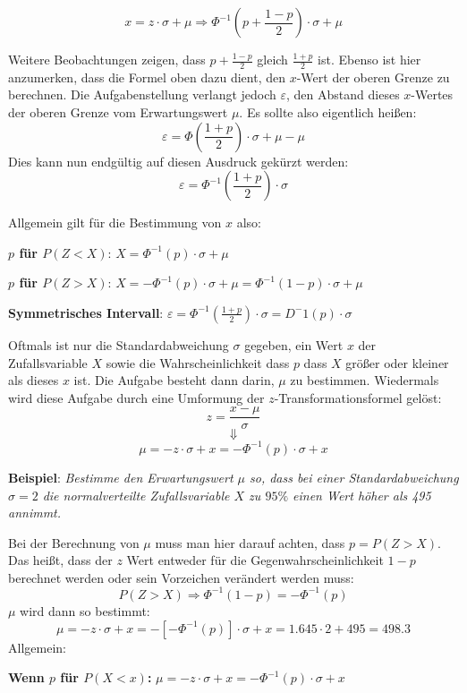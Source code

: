 $$x = z \cdot \sigma + \mu \Rightarrow \Phi^{-1}\left(p + \frac{1 -p}{2}\right) \cdot \sigma + \mu$$ 

\pagebreak

Weitere Beobachtungen zeigen, dass $p + \frac{1 - p}{2}$ gleich $\frac{1 + p}{2}$ ist. Ebenso ist hier anzumerken, dass die Formel oben dazu dient, den $x$-Wert der oberen Grenze zu berechnen. Die Aufgabenstellung verlangt jedoch $\varepsilon$, den Abstand dieses $x$-Wertes der oberen Grenze vom Erwartungswert $\mu$. Es sollte also eigentlich hei\ss{}en: $$\varepsilon = \Phi\left(\frac{1 + p}{2}\right) \cdot \sigma + \mu - \mu$$ Dies kann nun endg\"{u}ltig auf diesen Ausdruck gek\"{u}rzt werden: $$\varepsilon = \Phi^{-1}\left(\frac{1 + p}{2}\right) \cdot \sigma$$

Allgemein gilt f\"{u}r die Bestimmung von $x$ also:

\textbf{$p$ f\"{u}r $P(Z < X)$}: $X = \Phi^{-1}(p) \cdot \sigma + \mu$

\textbf{$p$ f\"{u}r $P(Z > X)$}: $X = -\Phi^{-1}(p) \cdot \sigma + \mu = \Phi^{-1}(1 - p) \cdot \sigma + \mu$

\textbf{Symmetrisches Intervall}: $\varepsilon = \Phi^{-1}\left(\frac{1 + p}{2}\right) \cdot \sigma = D^-1(p) \cdot \sigma$


Oftmals ist nur die Standardabweichung $\sigma$ gegeben, ein Wert $x$ der Zufallsvariable $X$ sowie die Wahrscheinlichkeit dass $p$ dass $X$ gr\"{o}\ss{}er oder kleiner als dieses $x$ ist. Die Aufgabe besteht dann darin, $\mu$ zu bestimmen. Wiedermals wird diese Aufgabe durch eine Umformung der $z$-Transformationsformel gel\"{o}st: $$z = \frac{x - \mu}{\sigma}$$ $$\Downarrow$$ $$\mu = -z \cdot \sigma + x = -\Phi^{-1}(p) \cdot \sigma + x$$

\textbf{Beispiel}: \emph{Bestimme den Erwartungswert $\mu$ so, dass bei einer Standardabweichung $\sigma = 2$ die normalverteilte Zufallsvariable $X$ zu $95 \%$ einen Wert h\"{o}her als 495 annimmt.}

Bei der Berechnung von $\mu$ muss man hier darauf achten, dass $p = P(Z > X)$. Das hei\ss{}t, dass der $z$ Wert entweder f\"{u}r die Gegenwahrscheinlichkeit $1 - p$ berechnet werden oder sein Vorzeichen ver\"{a}ndert werden muss: $$P(Z > X) \Rightarrow \Phi^{-1}(1 - p) = -\Phi^{-1}(p)$$ $\mu$ wird dann so bestimmt: $$\mu = -z \cdot \sigma + x = -[-\Phi^{-1}(p)] \cdot \sigma + x = 1.645 \cdot 2 + 495 = 498.3$$ Allgemein:

\textbf{Wenn $p$ f\"{u}r $P(X < x)$:} $\mu = -z \cdot \sigma + x = -\Phi^{-1}(p) \cdot \sigma + x$

